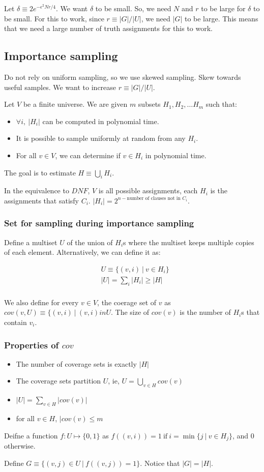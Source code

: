 Let $\delta \equiv 2e^{-\epsilon^2 Nr / 4}$. We want $\delta$ to be small.
So, we need $N$ and $r$ to be large for $\delta$ to be small. For this
to work, since $r \equiv |G|/|U|$, we need $|G|$ to be large. This means
that we need a large number of truth assignments for this to work.

\subsection{Importance sampling}
Do not rely on uniform sampling, so we use skewed sampling. Skew
towards useful samples. We want to increase $r \equiv |G|/|U|$.

Let $V$ be a finite universe. We are given $m$ subsets
$H_1, H_2, \dots H_m$ such that:

\begin{itemize}
\item $\forall i,~|H_i|$ can be computed in polynomial time.
\item It is possible to sample uniformly at random from any $H_i$.
\item For all $v \in V$, we can determine if $v \in H_i$ in polynomial time.
\end{itemize}

The goal is to estimate $H \equiv \bigcup_i H_i$.

In the equivalence to $DNF$, $V$ is all possible assignments,
each $H_i$ is the assignments that satisfy $C_i$. $|H_i| = 2^{n - \text{number of clauses not in $C_i$}}$.

\subsubsection{Set for sampling during importance sampling}

Define a multiset $U$ of the union of $H_i$s where the multiset keeps
multiple copies of each element. Alternatively, we can define it as:

\begin{align*}
  &U \equiv \{ (v, i)~\vert~v \in H_i \} \\
  &|U| = \sum_i |H_i| \geq |H| \\
\end{align*}

We also define for every $v \in V$, the coerage set of $v$ as $cov(v, U) \equiv \{ (v, i)~\vert~(v, i) in U$.
The size of $cov(v)$ is the number of $H_i$s that contain $v_i$.

\subsubsection{Properties of $cov$}
\begin{itemize}
\item The number of coverage sets is exactly $|H|$
\item The coverage sets partition $U$, ie, $U = \bigcup_{v \in H} cov(v)$
\item $|U| = \sum_{v \in H} |cov(v)|$
\item for all $v \in H$, $|cov(v) \leq m$ 
\end{itemize}


Deifne a function $f: U \mapsto \{0, 1\}$ as $f((v, i)) = 1~\text{if}~i = \min \{j~|~ v \in H_j \}$,
and $0$ otherwise.

Define $G \equiv \{ (v, j) \in U~\vert~f((v, j)) = 1 \}$. Notice that
$|G| = |H|$.
